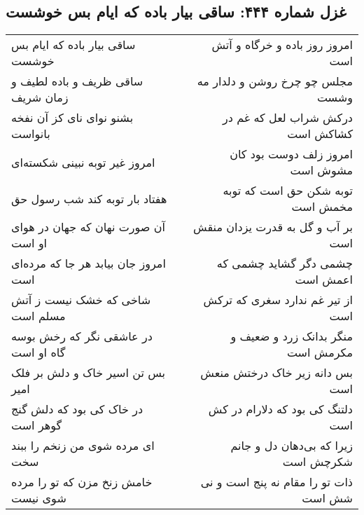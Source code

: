 \begin{center}
\section*{غزل شماره ۴۴۴: ساقی بیار باده که ایام بس خوشست}
\label{sec:0444}
\begin{longtable}{l p{0.5cm} r}
ساقی بیار باده که ایام بس خوشست
&&
امروز روز باده و خرگاه و آتش است
\\
ساقی ظریف و باده لطیف و زمان شریف
&&
مجلس چو چرخ روشن و دلدار مه وشست
\\
بشنو نوای نای کز آن نفخه بانواست
&&
درکش شراب لعل که غم در کشاکش است
\\
امروز غیر توبه نبینی شکسته‌ای
&&
امروز زلف دوست بود کان مشوش است
\\
هفتاد بار توبه کند شب رسول حق
&&
توبه شکن حق است که توبه مخمش است
\\
آن صورت نهان که جهان در هوای او است
&&
بر آب و گل به قدرت یزدان منقش است
\\
امروز جان بیابد هر جا که مرده‌ای است
&&
چشمی دگر گشاید چشمی که اعمش است
\\
شاخی که خشک نیست ز آتش مسلم است
&&
از تیر غم ندارد سغری که ترکش است
\\
در عاشقی نگر که رخش بوسه گاه او است
&&
منگر بدانک زرد و ضعیف و مکرمش است
\\
بس تن اسیر خاک و دلش بر فلک امیر
&&
بس دانه زیر خاک درختش منعش است
\\
در خاک کی بود که دلش گنج گوهر است
&&
دلتنگ کی بود که دلارام در کش است
\\
ای مرده شوی من زنخم را ببند سخت
&&
زیرا که بی‌دهان دل و جانم شکرچش است
\\
خامش زنخ مزن که تو را مرده شوی نیست
&&
ذات تو را مقام نه پنج است و نی شش است
\\
\end{longtable}
\end{center}
